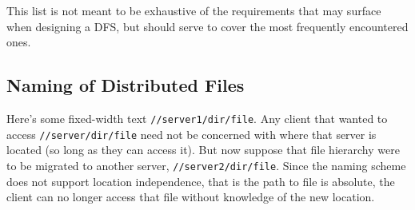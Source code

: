 \documentclass[letterpaper]{article}
\begin{document}
This list is not meant to be exhaustive of the requirements that may surface when designing a DFS, but should serve to cover the most frequently encountered ones.

\subsection{Naming of Distributed Files}
Here's some fixed-width text \texttt{//server1/dir/file}. Any client that wanted to access \texttt{//server/dir/file} need not be concerned with where that server is located (so long as they can access it). But now suppose that file hierarchy were to be migrated to another server, \texttt{//server2/dir/file}. Since the naming scheme does not support location independence, that is the path to file is absolute, the client can no longer access that file without knowledge of the new location.


\newpage
\end{document}
